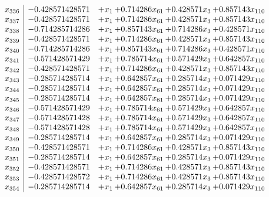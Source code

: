 \documentclass[11pt]{article}
\begin{document}
\[\begin{array}{c| c c@{\hskip 2pt} c@{\hskip 2pt} c@{\hskip 2pt} c@{\hskip 2pt} }
 x_{336}   &  -0.428571428571 & +  x_{1} & + 0.714286 x_{61} & + 0.428571 x_{3} & + 0.857143 x_{110}\\
 x_{337}   &  -0.428571428571 & +  x_{1} & + 0.714286 x_{61} & + 0.428571 x_{3} & + 0.857143 x_{110}\\
 x_{338}   &  -0.714285714286 & +  x_{1} & + 0.857143 x_{61} & + 0.714286 x_{3} & + 0.428571 x_{110}\\
 x_{339}   &  -0.428571428571 & +  x_{1} & + 0.714286 x_{61} & + 0.428571 x_{3} & + 0.857143 x_{110}\\
 x_{340}   &  -0.714285714286 & +  x_{1} & + 0.857143 x_{61} & + 0.714286 x_{3} & + 0.428571 x_{110}\\
 x_{341}   &  -0.571428571429 & +  x_{1} & + 0.785714 x_{61} & + 0.571429 x_{3} & + 0.642857 x_{110}\\
 x_{342}   &  -0.428571428571 & +  x_{1} & + 0.714286 x_{61} & + 0.428571 x_{3} & + 0.857143 x_{110}\\
 x_{343}   &  -0.285714285714 & +  x_{1} & + 0.642857 x_{61} & + 0.285714 x_{3} & + 0.071429 x_{110}\\
 x_{344}   &  -0.285714285714 & +  x_{1} & + 0.642857 x_{61} & + 0.285714 x_{3} & + 0.071429 x_{110}\\
 x_{345}   &  -0.285714285714 & +  x_{1} & + 0.642857 x_{61} & + 0.285714 x_{3} & + 0.071429 x_{110}\\
 x_{346}   &  -0.571428571429 & +  x_{1} & + 0.785714 x_{61} & + 0.571429 x_{3} & + 0.642857 x_{110}\\
 x_{347}   &  -0.571428571428 & +  x_{1} & + 0.785714 x_{61} & + 0.571429 x_{3} & + 0.642857 x_{110}\\
 x_{348}   &  -0.571428571428 & +  x_{1} & + 0.785714 x_{61} & + 0.571429 x_{3} & + 0.642857 x_{110}\\
 x_{349}   &  -0.285714285714 & +  x_{1} & + 0.642857 x_{61} & + 0.285714 x_{3} & + 0.071429 x_{110}\\
 x_{350}   &  -0.428571428571 & +  x_{1} & + 0.714286 x_{61} & + 0.428571 x_{3} & + 0.857143 x_{110}\\
 x_{351}   &  -0.285714285714 & +  x_{1} & + 0.642857 x_{61} & + 0.285714 x_{3} & + 0.071429 x_{110}\\
 x_{352}   &  -0.428571428571 & +  x_{1} & + 0.714286 x_{61} & + 0.428571 x_{3} & + 0.857143 x_{110}\\
 x_{353}   &  -0.428571428572 & +  x_{1} & + 0.714286 x_{61} & + 0.428571 x_{3} & + 0.857143 x_{110}\\
 x_{354}   &  -0.285714285714 & +  x_{1} & + 0.642857 x_{61} & + 0.285714 x_{3} & + 0.071429 x_{110}\\

\end{array}\]
\end{document}
